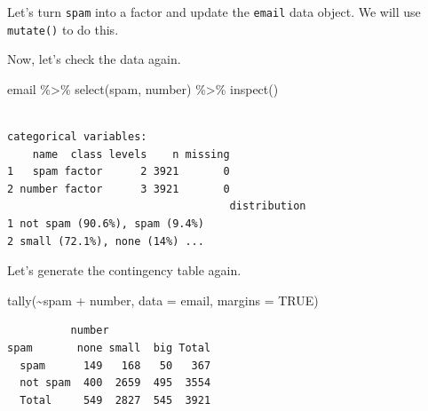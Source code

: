\documentclass[
  letterpaper,
  DIV=11,
  numbers=noendperiod]{scrreprt}
\newenvironment{Shaded}{\begin{snugshade}}{\end{snugshade}}
\newcommand{\AttributeTok}[1]{\textcolor[rgb]{0.40,0.45,0.13}{#1}}
\newcommand{\ConstantTok}[1]{\textcolor[rgb]{0.56,0.35,0.01}{#1}}
\newcommand{\DecValTok}[1]{\textcolor[rgb]{0.68,0.00,0.00}{#1}}
\newcommand{\FunctionTok}[1]{\textcolor[rgb]{0.28,0.35,0.67}{#1}}
\newcommand{\NormalTok}[1]{\textcolor[rgb]{0.00,0.23,0.31}{#1}}
\newcommand{\OtherTok}[1]{\textcolor[rgb]{0.00,0.23,0.31}{#1}}
\newcommand{\SpecialCharTok}[1]{\textcolor[rgb]{0.37,0.37,0.37}{#1}}
\newcommand{\StringTok}[1]{\textcolor[rgb]{0.13,0.47,0.30}{#1}}
\begin{document}
Let's turn \texttt{spam} into a factor and update the \texttt{email}
data object. We will use \texttt{mutate()} to do this.

\begin{Shaded}
\end{Shaded}

Now, let's check the data again.

\begin{Shaded}
\begin{Highlighting}[]
\NormalTok{email }\SpecialCharTok{\%\textgreater{}\%}
  \FunctionTok{select}\NormalTok{(spam, number) }\SpecialCharTok{\%\textgreater{}\%}
  \FunctionTok{inspect}\NormalTok{()}
\end{Highlighting}
\end{Shaded}

\begin{verbatim}

categorical variables:  
    name  class levels    n missing
1   spam factor      2 3921       0
2 number factor      3 3921       0
                                   distribution
1 not spam (90.6%), spam (9.4%)                
2 small (72.1%), none (14%) ...                
\end{verbatim}

Let's generate the contingency table again.

\begin{Shaded}
\begin{Highlighting}[]
\FunctionTok{tally}\NormalTok{(}\SpecialCharTok{\textasciitilde{}}\NormalTok{spam }\SpecialCharTok{+}\NormalTok{ number, }\AttributeTok{data =}\NormalTok{ email, }\AttributeTok{margins =} \ConstantTok{TRUE}\NormalTok{)}
\end{Highlighting}
\end{Shaded}

\begin{verbatim}
          number
spam       none small  big Total
  spam      149   168   50   367
  not spam  400  2659  495  3554
  Total     549  2827  545  3921
\end{verbatim}
\end{document}
